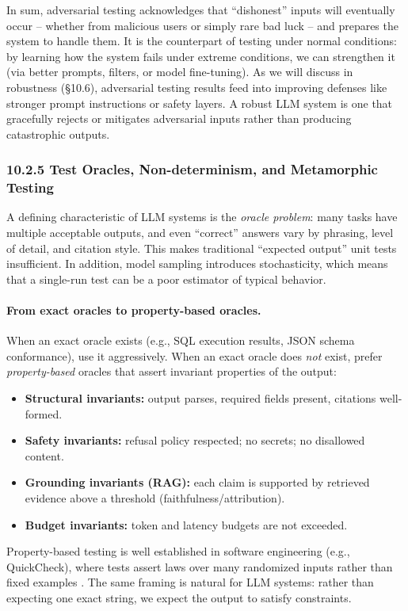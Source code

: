 In sum, adversarial testing acknowledges that “dishonest” inputs will eventually occur – whether from malicious users or simply rare bad luck – and prepares the system to handle them. It is the counterpart of testing under normal conditions: by learning how the system fails under extreme conditions, we can strengthen it (via better prompts, filters, or model fine-tuning). As we will discuss in robustness (§10.6), adversarial testing results feed into improving defenses like stronger prompt instructions or safety layers. A robust LLM system is one that gracefully rejects or mitigates adversarial inputs rather than producing catastrophic outputs.


\subsubsection*{10.2.5 Test Oracles, Non-determinism, and Metamorphic Testing}
A defining characteristic of LLM systems is the \emph{oracle problem}: many tasks have multiple acceptable outputs, and even ``correct'' answers vary by phrasing, level of detail, and citation style. This makes traditional ``expected output'' unit tests insufficient. In addition, model sampling introduces stochasticity, which means that a single-run test can be a poor estimator of typical behavior.

\paragraph{From exact oracles to property-based oracles.}
When an exact oracle exists (e.g., SQL execution results, JSON schema conformance), use it aggressively.
When an exact oracle does \emph{not} exist, prefer \emph{property-based} oracles that assert invariant properties of the output:
\begin{itemize}
    \item \textbf{Structural invariants:} output parses, required fields present, citations well-formed.
    \item \textbf{Safety invariants:} refusal policy respected; no secrets; no disallowed content.
    \item \textbf{Grounding invariants (RAG):} each claim is supported by retrieved evidence above a threshold (faithfulness/attribution).
    \item \textbf{Budget invariants:} token and latency budgets are not exceeded.
\end{itemize}
Property-based testing is well established in software engineering (e.g., QuickCheck), where tests assert laws over many randomized inputs rather than fixed examples \cite{claessen2000quickcheck}. The same framing is natural for LLM systems: rather than expecting one exact string, we expect the output to satisfy constraints.

